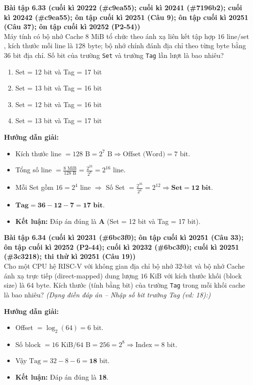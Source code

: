 \textbf{Bài tập 6.33 (cuối kì 20222 (\#c9ea55); cuối kì 20241 (\#7196b2); cuối kì 20242 (\#c9ea55); ôn tập cuối kì 20251 (Câu 9); ôn tập cuối kì 20251 (Câu 37); ôn tập cuối kì 20252 (P2-54))}\\
Máy tính có bộ nhớ Cache $8\text{ MiB}$ tổ chức theo ánh xạ liên kết tập hợp $16\text{ line/set}$, kích thước mỗi line là $128\text{ byte}$; bộ nhớ chính đánh địa chỉ theo từng byte bằng $36\text{ bit}$ địa chỉ. Số bit của trường \texttt{Set} và trường \texttt{Tag} lần lượt là bao nhiêu?
\begin{enumerate}[label=\Alph*.]
    \item Set = 12 bit và Tag = 17 bit
    \item Set = 13 bit và Tag = 16 bit
    \item Set = 12 bit và Tag = 16 bit
    \item Set = 13 bit và Tag = 17 bit
\end{enumerate}
\textbf{Hướng dẫn giải:}
\begin{itemize}
    \item Kích thước line $= 128\text{ B} = 2^7\text{ B} \Rightarrow \text{Offset (Word)} = 7\text{ bit}$.
    \item Tổng số line $= \frac{8\text{ MiB}}{128\text{ B}} = \frac{2^{23}}{2^7} = 2^{16}$ line.
    \item Mỗi Set gồm $16 = 2^4$ line $\Rightarrow$ Số Set $= \frac{2^{16}}{2^4} = 2^{12} \Rightarrow \mathbf{\text{Set} = 12\text{ bit}}$.
    \item $\mathbf{\text{Tag} = 36 - 12 - 7 = 17\text{ bit}}$.
    \item \textbf{Kết luận:} Đáp án đúng là \textbf{A} (Set = 12 bit và Tag = 17 bit).
\end{itemize}

\textbf{Bài tập 6.34 (cuối kì 20231 (\#6bc3f0); ôn tập cuối kì 20251 (Câu 33); ôn tập cuối kì 20252 (P2-44); cuối kì 20232 (\#6bc3f0); cuối kì 20251 (\#3c3218); thi thử kì 20251 (Câu 19))}\\
Cho một CPU hệ RISC-V với không gian địa chỉ bộ nhớ $32\text{-bit}$ và bộ nhớ Cache ánh xạ trực tiếp (direct-mapped) dung lượng $16\text{ KiB}$ với kích thước khối (block size) là $64\text{ byte}$. Kích thước (tính bằng bit) của trường \texttt{Tag} trong mỗi khối cache là bao nhiêu?
\textit{(Dạng điền đáp án -- Nhập số bit trường Tag (vd: 18):)}\par
\textbf{Hướng dẫn giải:}
\begin{itemize}
    \item Offset $= \log_2(64) = 6\text{ bit}$.
    \item Số block $= 16\text{ KiB} / 64\text{ B} = 256 = 2^8 \Rightarrow \text{Index} = 8\text{ bit}$.
    \item Vậy $\text{Tag} = 32 - 8 - 6 = \mathbf{18}$ bit.
    \item \textbf{Kết luận:} Đáp án đúng là \textbf{18}.
\end{itemize}

